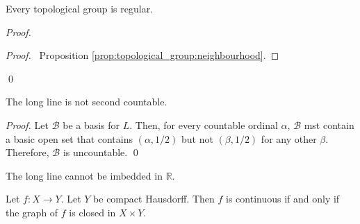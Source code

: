 \begin{prop}
  Every topological group is regular.
\end{prop}

\begin{proof}
  \pf
  \begin{proof}
    \pf\ Proposition \ref{prop:topological_group:neighbourhood}.
  \end{proof}
  \qed
\end{proof}

\begin{prop}
  The long line is not second countable.
\end{prop}

\begin{proof}
  \pf Let $\mathcal{B}$ be a basis for $L$. Then, for every countable ordinal
  $\alpha$, $\mathcal{B}$ mst contain a basic open set that contains
  $(\alpha, 1/2)$ but not $(\beta, 1/2)$ for any other $\beta$. Therefore,
  $\mathcal{B}$ is uncountable. \qed
\end{proof}

\begin{cor}
  The long line cannot be imbedded in $\mathbb{R}$.
\end{cor}

\begin{thm}
  Let $f : X \rightarrow Y$. Let $Y$ be compact Hausdorff. Then $f$ is
  continuous if and only if the graph of $f$ is closed in $X \times Y$.
\end{thm}

